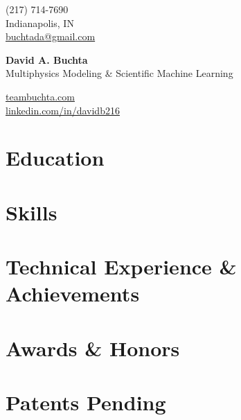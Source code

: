 \documentclass[letter,10pt]{article}
\makeatletter
\def\name{David A. Buchta}
\def\phone{(217) 714-7690}
\def\city{Indianapolis, IN}
\def\email{buchtada@gmail.com}
\def\LinkedIn{davidb216}
\def\role{Multiphysics Modeling \& Scientific Machine Learning}
\makeatother
\begin{document}
\noindent
\begin{minipage}[t]{0.3\textwidth}
\raggedright
\phone \\
\city \\
\href{mailto:\email}{\email}
\end{minipage}%
\hfill
\begin{minipage}[t]{0.4\textwidth}
\centering
{\Huge \textbf{\name}} \\
\vspace{0.25em}
{\Large\color{highlight} \role}
\end{minipage}%
\hfill
\begin{minipage}[t]{0.3\textwidth}
\raggedleft
\href{https://teambuchta.com/}{teambuchta.com} \\
\href{https://www.linkedin.com/in/\LinkedIn}{linkedin.com/in/\LinkedIn}
\end{minipage}

\vspace{0.5em}
\noindent\makebox[\linewidth]{\color{highlight}\rule{\paperwidth}{1pt}}
\vspace{0.5em}



\section{Education}


\section{Skills}


\section{Technical Experience \& Achievements}


\section{Awards \& Honors}



\section{Patents Pending}

\vspace{1em}
\end{document}
